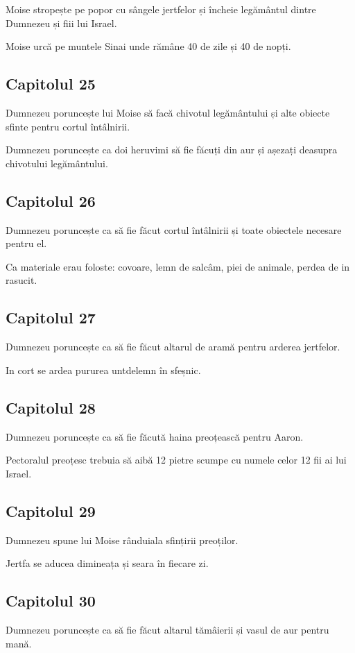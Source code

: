 \documentclass[12pt,a4paper]{article}
\begin{document}
Moise stropește pe popor cu sângele jertfelor și încheie legământul dintre Dumnezeu și fiii lui Israel.

Moise urcă pe muntele Sinai unde rămâne 40 de zile și 40 de nopți.

\subsection{Capitolul 25}

Dumnezeu poruncește lui Moise să facă chivotul legământului și alte obiecte sfinte pentru cortul întâlnirii.

Dumnezeu poruncește ca doi heruvimi să fie făcuți din aur și așezați deasupra chivotului legământului.

\subsection{Capitolul 26}

Dumnezeu poruncește ca să fie făcut cortul întâlnirii și toate obiectele necesare pentru el.

Ca materiale erau foloste: covoare, lemn de salcâm, piei de animale, perdea de in rasucit.

\subsection{Capitolul 27}

Dumnezeu poruncește ca să fie făcut altarul de aramă pentru arderea jertfelor.

In cort se ardea pururea untdelemn în sfeșnic.

\subsection{Capitolul 28}

Dumnezeu poruncește ca să fie făcută haina preoțească pentru Aaron.

Pectoralul preoțesc trebuia să aibă 12 pietre scumpe cu numele celor 12 fii ai lui Israel.

\subsection{Capitolul 29}

Dumnezeu spune lui Moise rânduiala sfințirii preoților.

Jertfa se aducea dimineața și seara în fiecare zi.

\subsection{Capitolul 30}
Dumnezeu poruncește ca să fie făcut altarul tămâierii și vasul de aur pentru mană.
\end{document}
